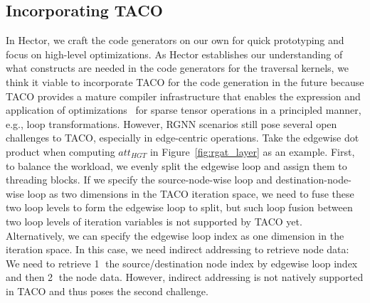 \subsection{Incorporating TACO} In Hector, we craft the code generators on our own for quick prototyping and focus on high-level optimizations. As Hector establishes our understanding of what constructs are needed in the code generators for the traversal kernels, we think it viable to incorporate TACO for the code generation in the future because TACO provides a mature compiler infrastructure that enables the expression and application of optimizations~\cite{kjolstadTensorAlgebraCompilation2019} for sparse tensor operations in a principled manner, e.g., loop transformations. However, RGNN scenarios still pose several open challenges to TACO, especially in edge-centric operations. Take the edgewise dot product when computing $att_{HGT}$ in Figure~\ref{fig:rgat_layer} as an example. First, to balance the workload, we evenly split the edgewise loop and assign them to threading blocks. If we specify the source-node-wise loop and destination-node-wise loop as two dimensions in the TACO iteration space, we need to fuse these two loop levels to form the edgewise loop to split, but such loop fusion between two loop levels of iteration variables is not supported by TACO yet. Alternatively, we can specify the edgewise loop index as one dimension in the iteration space. In this case, we need indirect addressing to retrieve node data: We need to retrieve \textcircled{1} the source/destination node index by edgewise loop index and then \textcircled{2} the node data. However, indirect addressing is not natively supported in TACO and thus poses the second challenge.

